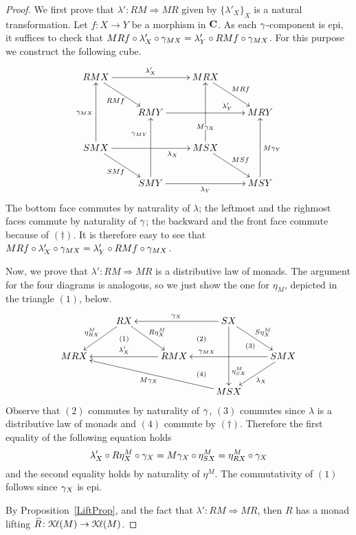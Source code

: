 \documentclass[oribibl,envcountsame,envcountsect,runningheads]{llncs}
\newcommand{\Kl}{\mathcal{K}{\kern-.2ex}\ell}
\newcommand{\lift}[1]{\smash{\widehat{#1}}}
\renewcommand{\>}{\rangle}
\def\To{\Rightarrow}
\begin{document}
\begin{proof}
We first prove that $\lambda'\colon RM \To MR$ given by $\{\lambda'_X\}_{X}$ is a natural transformation.
Let $f \colon X \to Y$ be a morphism in $\mathbf{C}$. As each $\gamma$-component is epi, it suffices to check that $MRf \circ \lambda'_X \circ \gamma_{MX} = \lambda'_Y \circ RMf \circ \gamma_{MX}$. For this purpose we construct the following cube.
 $$\xymatrix{
 RMX  \ar[rd]_{RMf} \ar[rr]^{\lambda'_X} && MRX \ar[rd]^{MRf}\\
 & RMY \ar[rr]^(0.7){\lambda'_Y} && MRY\\
 SMX \ar[rd]_{SMf} \ar[uu]^{\quotG_{MX}} \ar[rr]_(0.7){\lambda_X} && MSX \ar[rd]^{MSf} \ar[uu]|(0.3){M{\quotG}_X}\\
 & SMY \ar[uu]^(0.7){\quotG_{MY}} \ar[rr]_{\lambda_Y} && MSY \ar[uu]_{M{\quotG}_Y}
 }$$
The bottom face commutes by naturality of $\lambda$; the leftmost and the righmost faces commute by naturality of $\gamma$; the backward and the front face commute because of $(\dagger)$. It is therefore easy to see that $MRf \circ \lambda'_X \circ \gamma_{MX} = \lambda'_Y \circ RMf \circ \gamma_{MX}$.

Now, we prove that $\lambda'\colon RM \To MR$ is a distributive law of monads. The argument for the four diagrams is analogous, so we just show the one for $\eta_M$, depicted in the triangle $(1)$, below.
$$\xymatrix{
& RX \ar@{}[d]|{(1)} \ar[rd]^{R\eta^M_X} \ar[ld]_{\eta^M_{RX}} & & SX \ar@{}[ld]|{(2)} \ar[dd]^(0.7){\eta^M_{SX}} \ar[ll]_{\quotG_X} \ar[rd]^{S\eta^M_X}\\
MRX & & RMX \ar[ll]_{\lambda'_X} & & SMX \ar@{}[llu]|(0.3){(3)} \ar[ld]^{\lambda_X} \ar[ll]_(0.7){\quotG_{MX}}\\
& & & MSX \ar@{}[lu]|{(4)} \ar[ulll]^{M{\quotG}_X}
}$$
Observe that $(2)$ commutes by naturality of $\gamma$, $(3)$ commutes since $\lambda$ is a distributive law of monads and $(4)$ commute by $(\dagger)$.
Therefore the first equality of the following equation holds $$\lambda'_X \circ R\eta^M_X \circ \gamma_X = M{\gamma}_X \circ \eta^M_{SX}=\eta^M_{RX}\circ \gamma_X$$ and the second equality holds by naturality of $\eta^M$. The commutativity of $(1)$ follows since $\gamma_X$ is epi.

By Proposition~\ref{LiftProp}, and the fact that $\lambda'\colon RM \To MR$, then $R$ has a monad lifting $\lift{R} \colon \Kl(M) \to \Kl(M)$.


\end{proof}
\end{document}
